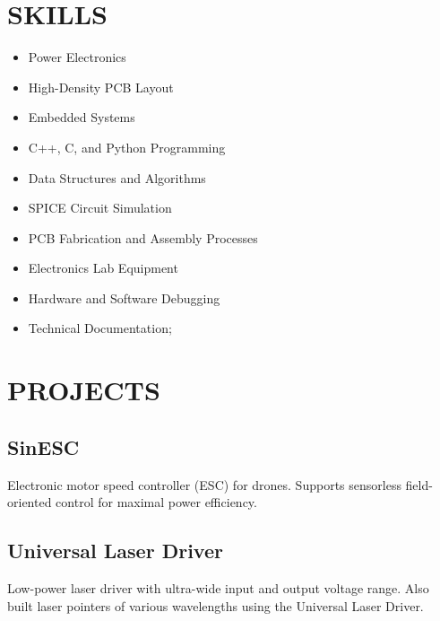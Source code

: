 

	\maketitle
	
	\section*{SKILLS}
	\begin{minipage}{0.5\textwidth}
		\centering
		\begin{itemize}
			\setlength \itemsep{0.1em}
			\item Power Electronics
			\item High-Density PCB Layout
			\item Embedded Systems
			\item C++, C, and Python Programming
			\item Data Structures and Algorithms
		\end{itemize}
	\end{minipage}%
	\begin{minipage}{0.5\textwidth}
		\centering
		\begin{itemize}
			\setlength \itemsep{0.1em}
			\item SPICE Circuit Simulation
			\item PCB Fabrication and Assembly Processes
			\item Electronics Lab Equipment
			\item Hardware and Software Debugging
			\item Technical Documentation; \latex
		\end{itemize}
	\end{minipage}
	
	\section*{PROJECTS}
	\subsection{SinESC}
	Electronic motor speed controller (ESC) for drones. Supports sensorless field-oriented control for maximal power efficiency.
	\subsection{Universal Laser Driver}
	Low-power laser driver with ultra-wide input and output voltage range. Also built laser pointers of various wavelengths using the Universal Laser Driver.
